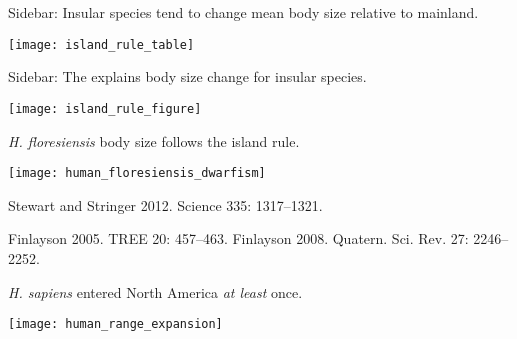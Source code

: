 \documentclass[t]{beamer}
\begin{document}
{
\begin{frame}[b]{}

\end{frame}}

\begin{frame}{Sidebar: Insular species tend to change mean body size relative to mainland.}
	\vspace{-\baselineskip}
	\begin{center}
		\texttt{[image: island\_rule\_table]}
	\end{center}
\end{frame}

\begin{frame}{Sidebar: The  explains body size change for insular species.}
	\vspace{-\baselineskip}
	\begin{center}
		\texttt{[image: island\_rule\_figure]}
	\end{center}
\end{frame}

\begin{frame}{\textit{H. floresiensis} body size follows the island rule.}
	\vspace{-\baselineskip}
	\begin{center}
		\texttt{[image: human\_floresiensis\_dwarfism]}
	\end{center}
\end{frame}




{
\begin{frame}[b]{}

\tiny Stewart and Stringer 2012. Science 335: 1317–1321.
\end{frame}}

{
\begin{frame}[b]{}

\hfill\tiny Finlayson 2005. TREE 20: 457–463. Finlayson 2008. Quatern. Sci. Rev. 27: 2246–2252.
\end{frame}}

\begin{frame}{\textit{H. sapiens} entered North America \emph{at least} once.}
	\vspace{-\baselineskip}
	\begin{center}
		\texttt{[image: human\_range\_expansion]}
	\end{center}
\end{frame}
\end{document}
